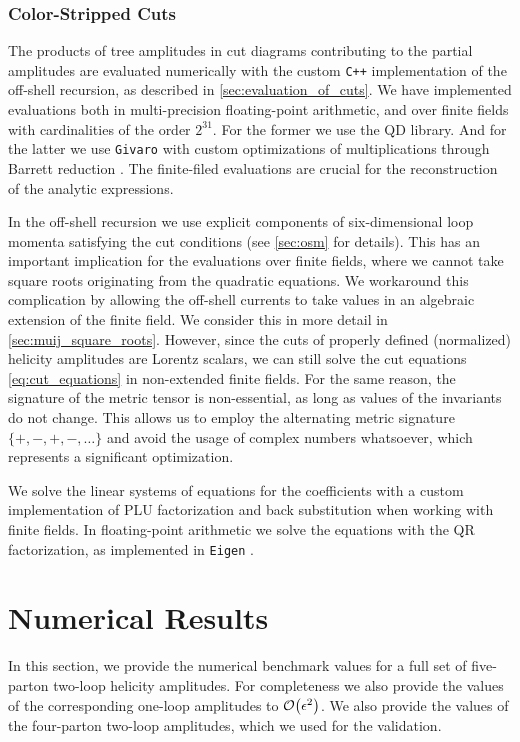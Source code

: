 \subsubsection{Color-Stripped Cuts}
The products of tree amplitudes in cut diagrams contributing to the partial amplitudes are evaluated
numerically with the custom \texttt{C++} implementation of the off-shell recursion, as described in \cref{sec:evaluation_of_cuts}.
We have implemented evaluations both in multi-precision floating-point arithmetic, and over finite fields with cardinalities of the order $2^{31}$.
For the former we use the QD \cite{QD} library. And for the latter we use \texttt{Givaro} \cite{Givaro} with 
custom optimizations of multiplications through Barrett reduction \cite{Barrett1987a,Hoeven2014}.
The finite-filed evaluations are crucial for the reconstruction of the analytic expressions.

In the off-shell recursion we use explicit components of six-dimensional loop momenta 
satisfying the cut conditions (see \cref{sec:osm} for details). 
This has an important implication for the evaluations over finite fields, where
we cannot take square roots originating from the quadratic equations.
We workaround this complication by allowing the off-shell currents to
take values in an algebraic extension of the finite field.
We consider this in more detail in \cref{sec:muij_square_roots}.
However, since the cuts of properly defined (normalized) helicity amplitudes are Lorentz scalars,
we can still solve the cut equations \eqref{eq:cut_equations} in non-extended finite fields.
For the same reason, the signature of the metric tensor is non-essential, as long as values 
of the invariants do not change. This allows us to employ the alternating metric signature $\{+,-,+,-,\ldots{}\}$
and avoid the usage of complex numbers whatsoever, which represents a significant optimization.

We solve the linear systems of equations for the coefficients with a custom implementation of PLU factorization and back substitution
when working with finite fields. In floating-point arithmetic we solve the equations with the QR factorization,
as implemented in \texttt{Eigen} \cite{eigen}.




\section{Numerical Results}
\label{sec:5parton:numerics}

In this section, we provide the numerical benchmark values for a full set of  five-parton two-loop helicity amplitudes.
For completeness we also provide the values  of the corresponding one-loop amplitudes to $\order{\eps^2}$.
We also provide the values of the four-parton two-loop amplitudes, which we used for the validation.

